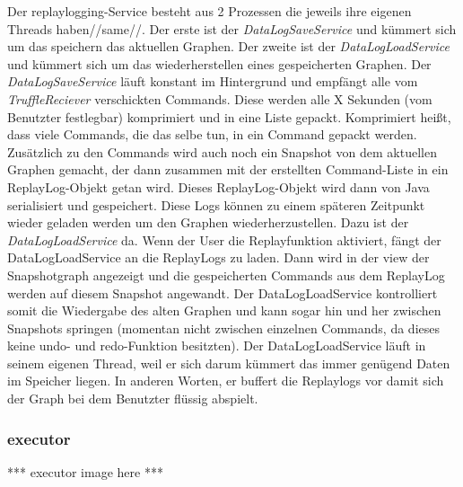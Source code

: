     Der replaylogging-Service besteht aus 2 Prozessen die jeweils ihre eigenen Threads haben//same//.
    Der erste ist der \textit{DataLogSaveService} und kümmert sich um das speichern das aktuellen
    Graphen. Der zweite ist der \textit{DataLogLoadService} und kümmert sich um das
    wiederherstellen eines gespeicherten Graphen.
    \newline
    \newline
    Der \textit{DataLogSaveService} läuft konstant im Hintergrund und empfängt alle
    vom \textit{TruffleReciever} verschickten Commands. Diese werden alle X
    Sekunden (vom Benutzter festlegbar) komprimiert und in eine Liste gepackt.
    Komprimiert heißt, dass viele Commands, die das selbe tun, in ein Command
    gepackt werden. Zusätzlich zu den Commands wird auch noch ein Snapshot
    von dem aktuellen Graphen gemacht, der dann zusammen mit der erstellten
    Command-Liste in ein ReplayLog-Objekt getan wird. Dieses
    ReplayLog-Objekt wird dann von Java serialisiert und gespeichert.
    \newline
    \newline
    Diese Logs können zu einem späteren Zeitpunkt wieder geladen werden um den
    Graphen wiederherzustellen. Dazu ist der \textit{DataLogLoadService} da. Wenn
    der User die Replayfunktion aktiviert, fängt der DataLogLoadService an die
    ReplayLogs zu laden. Dann wird in der view der Snapshotgraph angezeigt
    und die gespeicherten Commands aus dem ReplayLog werden auf
    diesem Snapshot angewandt. Der DataLogLoadService kontrolliert somit die
    Wiedergabe des alten Graphen und kann sogar hin und her zwischen Snapshots
    springen (momentan nicht zwischen einzelnen Commands, da dieses keine undo-
    und redo-Funktion besitzten).
    \newline
    \newline
    Der DataLogLoadService läuft in seinem eigenen Thread, weil er sich darum
    kümmert das immer genügend Daten im Speicher liegen. In anderen Worten, er
    buffert die Replaylogs vor damit sich der Graph bei dem Benutzter flüssig
    abspielt.

    \subsubsection{executor}
    \label{subsubsec:executor}

    *** executor image here ***
    \newline
    \newline

